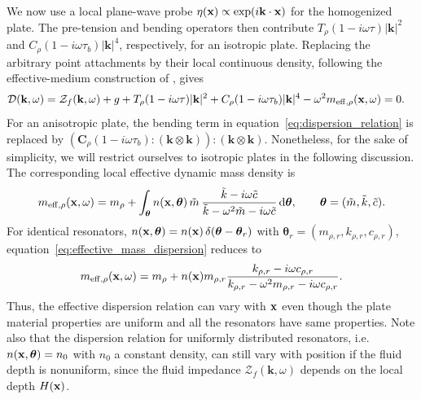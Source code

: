 We now use a local plane-wave probe $\eta(\mathbf{x})\propto\exp(i\mathbf{k}\cdot\mathbf{x})$ for the homogenized plate. The pre-tension and bending operators then contribute $T_\rho(1-i\omega\tau)|\mathbf{k}|^2$ and $C_\rho(1-i\omega\tau_b)|\mathbf{k}|^4$, respectively, for an isotropic plate. Replacing the arbitrary point attachments by their local continuous density, following the effective-medium construction of \cite{liu2025metaplate}, gives
\begin{equation}\label{eq:dispersion_relation}
\begin{aligned}
    \mathcal{D}(\mathbf{k},\omega)={}&\mathcal{Z}_f(\mathbf{k},\omega)+g
    +T_\rho(1-i\omega\tau)|\mathbf{k}|^2
    +C_\rho(1-i\omega\tau_b)|\mathbf{k}|^4
    -\omega^2m_{\mathrm{eff},\rho}(\mathbf{x},\omega)=0.
\end{aligned}
\end{equation}
For an anisotropic plate, the bending term in equation~\eqref{eq:dispersion_relation} is replaced by $(\mathbf{C}_\rho(1-i\omega\tau_b):(\mathbf{k}\otimes\mathbf{k})):(\mathbf{k}\otimes\mathbf{k})$. Nonetheless, for the sake of simplicity, we will restrict ourselves to isotropic plates in the following discussion.
The corresponding local effective dynamic mass density is
\begin{equation}\label{eq:effective_mass_dispersion}
    m_{\mathrm{eff},\rho}(\mathbf{x},\omega)
    =m_\rho+\int_{\boldsymbol{\theta}}
    n(\mathbf{x},\boldsymbol{\theta})\,
    \tilde m\,\frac{\tilde k-i\omega \tilde c}
    {\tilde k-\omega^2\tilde m-i\omega \tilde c}
    \,\mathrm{d}\boldsymbol{\theta},
    \qquad \boldsymbol{\theta}=(\tilde m,\tilde k,\tilde c).
\end{equation}
For identical resonators, $n(\mathbf{x},\boldsymbol{\theta})=n(\mathbf{x})\,\delta(\boldsymbol{\theta}-\boldsymbol{\theta}_r)$ with $\boldsymbol{\theta}_r=(m_{\rho,r},k_{\rho,r},c_{\rho,r})$, equation~\eqref{eq:effective_mass_dispersion} reduces to 
\begin{equation}\label{eq:effective_mass_dispersion_single}
  m_{\mathrm{eff},\rho}(\mathbf{x},\omega)=m_\rho+n(\mathbf{x})m_{\rho,r}\frac{k_{\rho,r}-i\omega c_{\rho,r}}{k_{\rho,r}-\omega^2m_{\rho,r}-i\omega c_{\rho,r}}.
\end{equation}
Thus, the effective dispersion relation can vary with $\mathbf{x}$ even though the plate material properties are uniform and all the resonators have same properties. Note also that the dispersion relation for uniformly distributed resonators, i.e. $n(\mathbf{x},\boldsymbol{\theta})=n_0$ with $n_0$ a constant density, can still vary with position if the fluid depth is nonuniform, since the fluid impedance $\mathcal{Z}_f(\mathbf{k},\omega)$ depends on the local depth $H(\mathbf{x})$.

